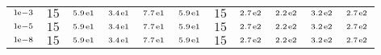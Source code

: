 \begin{tiny}
\begin{tabular}{@{$\;$}c@{$\;$}|@{$\;$}c@{$\;$}@{$\;$}c@{$\;$}@{$\;$}c@{$\;$}@{$\;$}c@{$\;$}@{$\;$}c@{$\;$}|@{$\;$}c@{$\;$}@{$\;$}c@{$\;$}@{$\;$}c@{$\;$}@{$\;$}c@{$\;$}@{$\;$}c@{$\;$}}
$\scriptstyle1\!\mathrm{\hspace{0.10em}e}-3$ & $\scriptstyle15$ & $\scriptstyle5.9\mathrm{\hspace{0.10em}e}1$ & $\scriptstyle3.4\mathrm{\hspace{0.10em}e}1$ & $\scriptstyle7.7\mathrm{\hspace{0.10em}e}1$ & $\scriptstyle5.9\mathrm{\hspace{0.10em}e}1$ & $\scriptstyle15$ & $\scriptstyle2.7\mathrm{\hspace{0.10em}e}2$ & $\scriptstyle2.2\mathrm{\hspace{0.10em}e}2$ & $\scriptstyle3.2\mathrm{\hspace{0.10em}e}2$ & $\scriptstyle2.7\mathrm{\hspace{0.10em}e}2$\\ 
$\scriptstyle1\!\mathrm{\hspace{0.10em}e}-5$ & $\scriptstyle15$ & $\scriptstyle5.9\mathrm{\hspace{0.10em}e}1$ & $\scriptstyle3.4\mathrm{\hspace{0.10em}e}1$ & $\scriptstyle7.7\mathrm{\hspace{0.10em}e}1$ & $\scriptstyle5.9\mathrm{\hspace{0.10em}e}1$ & $\scriptstyle15$ & $\scriptstyle2.7\mathrm{\hspace{0.10em}e}2$ & $\scriptstyle2.2\mathrm{\hspace{0.10em}e}2$ & $\scriptstyle3.2\mathrm{\hspace{0.10em}e}2$ & $\scriptstyle2.7\mathrm{\hspace{0.10em}e}2$\\ 
$\scriptstyle1\!\mathrm{\hspace{0.10em}e}-8$ & $\scriptstyle15$ & $\scriptstyle5.9\mathrm{\hspace{0.10em}e}1$ & $\scriptstyle3.4\mathrm{\hspace{0.10em}e}1$ & $\scriptstyle7.7\mathrm{\hspace{0.10em}e}1$ & $\scriptstyle5.9\mathrm{\hspace{0.10em}e}1$ & $\scriptstyle15$ & $\scriptstyle2.7\mathrm{\hspace{0.10em}e}2$ & $\scriptstyle2.2\mathrm{\hspace{0.10em}e}2$ & $\scriptstyle3.2\mathrm{\hspace{0.10em}e}2$ & $\scriptstyle2.7\mathrm{\hspace{0.10em}e}2$\\ 
\end{tabular} 
\end{tiny} 
